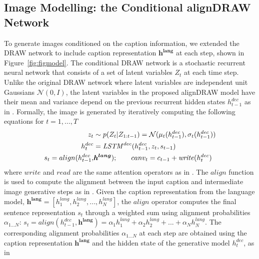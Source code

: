 \documentclass{article} %
\newcommand{\comm}[1]{}
\newcommand{\hlang}{h^{lang}}
\newcommand{\hlangall}{\boldsymbol{h^{lang}}}
\newcommand{\hdec}{h^{dec}}
\newcommand{\readop}{\mathit{read}}
\newcommand{\writeop}{\mathit{write}}
\newcommand{\decoder}{\mathit{LSTM}^{dec}}
\newcommand{\canv}{c}
\newcommand{\lat}{z}
\newcommand{\Lat}{Z}
\newcommand{\prior}{p}
\begin{document}
\subsection{Image Modelling: the Conditional alignDRAW Network}
\comm{
The DRAW network \cite{gregor_draw} is a sequential probabilistic model generating images by accumulating the output at each iterative step. While the original DRAW network assumes the latent variables are independent, it has shown in \citep{bachman_sdm} the model performance is improved by including the dependencies of latent variables. 
}
To generate images conditioned on the caption information, we extended the DRAW network \citep{gregor_draw} to include caption representation $\hlangall$ at each step, shown in Figure~\ref{fig:figmodel}. The conditional DRAW network is a stochastic recurrent neural network that consists of a set of latent variables $\Lat_t$ at each time step. Unlike the original DRAW network where latent variables are independent unit Gaussians $\mathcal{N}(0, I)$, the latent variables in the proposed alignDRAW model have their mean and variance depend on the previous recurrent hidden states $\hdec_{t-1}$ as in \cite{bachman_sdm}. Formally, the image is generated by iteratively computing the following equations for $t=1,...,T$
\begin{align}
\vspace{-0.1in}
\label{eq:x_hat}
\lat_t &\sim \prior(\Lat_t|\Lat_{1:t-1}) = \mathcal{N}(\mu_{t}(\hdec_{t-1}), \sigma_{t}(\hdec_{t-1}))\\
\hdec_t &= \decoder(\hdec_{t-1}, z_t, s_{t-1})\\
s_{t} = align(\hdec_{t-1}, & \hlangall); \quad \quad
canv_t = \canv_{t-1} + \writeop(\hdec_t)
\label{eq:write}
\end{align}
where $\writeop$ and $\readop$ are the same attention operators as in \citep{gregor_draw}.
The $align$ function is used to compute the alignment between the input caption and intermediate image generative steps as in \cite{bahdanau_mt}. Given the caption representation from the language model, $\hlangall = [\hlang_{1}, \hlang_{2}, ..., \hlang_{N}]$, the $align$ operator computes the final sentence representation $s_t$ through a weighted sum using alignment probabilities $\alpha_{1...N}$:
$s_t=align(\hdec_{t-1}, \hlangall) = \alpha_{1}\hlang_{1} + \alpha_{2}\hlang_{2} + ... + \alpha_{N}\hlang_{N}.$
The corresponding alignment probabilities $\alpha_{1...N}$ at each step are obtained using the caption representation $\hlangall$ and the hidden state of the generative model $\hdec_{t}$, as in \citep{bahdanau_mt}
\comm{
\begin{align}
e_{tj} &= v^{T}tanh(U\hlang_{j} + W\hdec_{t} + b)\\
\alpha_{j} &= \frac{exp(e_{tj})}{\sum_{j=1}^{N}exp(e_{tj})}.
\end{align}
}
\comm{
Here $\hlang_{0}$ is initialized to the learned bias.
Setting $\alpha_{1...N}$ to $\frac{1}{N}$ turns the encoder into the vanilla model introduced in \citep{cho_mt} without the attention. 
}
\end{document}
